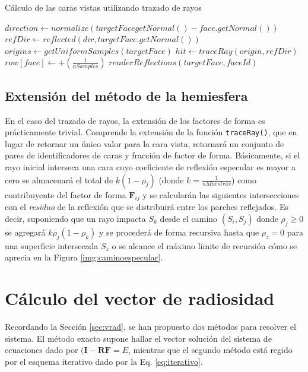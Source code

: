 \begin{algorithm}
	\caption{Cálculo de las caras vistas utilizando trazado de rayos}
	\label{alg:reflections}
	\begin{algorithmic}
			\State $direction \gets normalize(targetFacegetNormal() - face.getNormal())$
			\State $refDir \gets reflected(dir, targetFace.getNormal())$
			\State $origins \gets getUniformSamples(targetFace)$
				\State $hit \gets traceRay(origin, refDir)$
				\State $row[face] \gets +(\frac{1}{nSamples})$
						\State $renderReflections(targetFace, faceId)$
					\EndIf
				\EndIf
			\EndLoop
		\EndFunction
	\end{algorithmic}
\end{algorithm}

\subsection{Extensión del método de la hemiesfera}

En el caso del trazado de rayos, la extensión de los factores de forma es prácticamente trivial. Comprende la extensión de la función \verb|traceRay()|, que en lugar de retornar un único valor para la cara vista, retornará un conjunto de pares de identificadores de caras y fracción de factor de forma. Básicamente, si el rayo inicial interseca una cara cuyo coeficiente de reflexión especular es mayor a cero se almacenará el total de $k(1 - \rho_{j})$ (donde $k = \frac{1}{nMuestras}$) como contribuyente del factor de forma $\mathbf{F}_{ij}$ y se calcularán las siguientes intersecciones con el \textit{residuo} de la reflexión que se distribuirá entre los parches reflejados. Es decir, suponiendo que un rayo impacta $S_{k}$ desde el camino $(S_{i}, S_{j})$ donde $\rho_{j} \ge 0$ se agregará $k\rho_{j}(1 - \rho_{k})$ y se procederá de forma recursiva hasta que $\rho_{z} = 0$ para una superficie intersecada $S_{z}$ o se alcance el máximo límite de recursión cómo se aprecia en la Figura \ref{img:caminoespecular}.

\section{Cálculo del vector de radiosidad}

Recordando la Sección \ref{sec:vrad}, se han propuesto dos métodos para resolver el sistema. El método exacto supone hallar el vector solución del sistema de ecuaciones dado por $(\mathbf{I - RF} = E$, mientras que el segundo método está regido por el esquema iterativo dado por la Eq. \eqref{eq:iterativo}.

